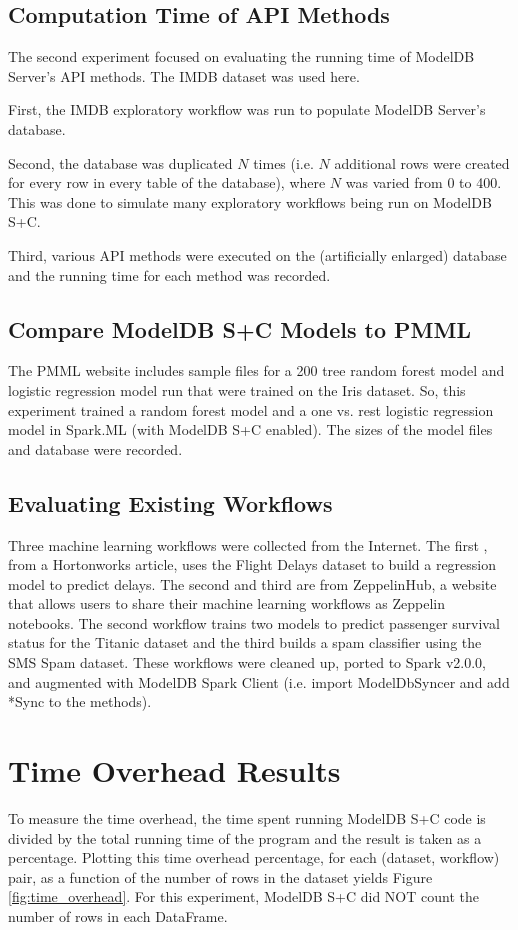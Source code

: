 \subsection{Computation Time of API Methods}
The second experiment focused on evaluating the running time of ModelDB Server's API methods. The
IMDB dataset was used here.

First, the IMDB exploratory workflow was run to populate ModelDB Server's database.

Second, the database was duplicated $N$ times (i.e. $N$ additional rows were created for
every row in every table of the database), where $N$ was varied from 0 to 400. This was
done to simulate many exploratory workflows being run on ModelDB S+C.

Third, various API methods were executed on the (artificially enlarged) database and the
running time for each method was recorded.

\subsection{Compare ModelDB S+C Models to PMML}
The PMML website \cite{pmmlwebsite} includes sample files for a 200 tree random forest model
and logistic regression model run that were trained on the Iris dataset. So, this
experiment trained a random forest model and a one vs. rest logistic regression model
in Spark.ML (with ModelDB S+C enabled). The sizes of the model files and database
were recorded.

\subsection{Evaluating Existing Workflows}
Three machine learning workflows were collected from the Internet. The first \cite{flightworkflow}, from
a Hortonworks article, uses the Flight Delays dataset to build a regression model to predict
delays. The second \cite{titanicworkflow} and third \cite{spamworkflow} are from ZeppelinHub, a website that allows users to share their
machine learning workflows as Zeppelin notebooks. The second workflow trains two models
to predict passenger survival status for the Titanic dataset and the third builds a spam classifier
using the SMS Spam dataset. These workflows were cleaned up, ported to Spark v2.0.0, and 
augmented with ModelDB Spark Client (i.e. import ModelDbSyncer and add *Sync to the methods).

\section{Time Overhead Results}
To measure the time overhead, the time spent running ModelDB S+C code is divided 
by the total running time of the program and the result is taken as a percentage.
Plotting this time overhead percentage, for each (dataset, workflow) pair,
as a function of the number of rows in the dataset yields Figure \ref{fig:time_overhead}.
For this experiment, ModelDB S+C did NOT count the number of rows in each DataFrame.

